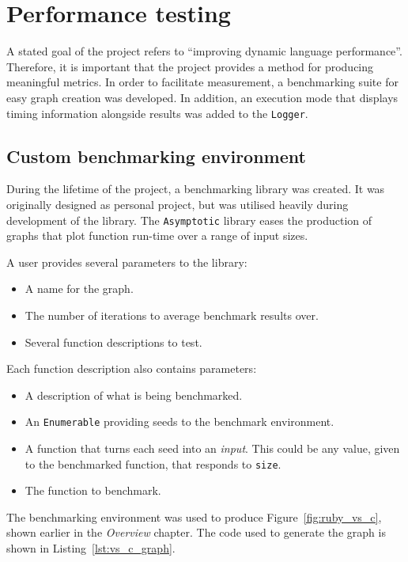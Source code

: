 \section{Performance testing}
A stated goal of the project refers to ``improving dynamic language performance''.
Therefore, it is important that the project provides a method for producing meaningful metrics.
In order to facilitate measurement, a benchmarking suite for easy graph creation was developed.
In addition, an execution mode that displays timing information alongside results was added to the \verb|Logger|.

\subsection{Custom benchmarking environment}
During the lifetime of the project, a benchmarking library was created. It was originally designed as personal project, but was utilised heavily during development of the library.  The \verb|Asymptotic| library eases the production of graphs that plot function run-time over a range of input sizes.

A user provides several parameters to the library:
\begin{itemize}
\item A name for the graph.
\item The number of iterations to average benchmark results over.
\item Several function descriptions to test.
\end{itemize}

Each function description also contains parameters:
\begin{itemize}
\item A description of what is being benchmarked.
\item An \verb|Enumerable| providing seeds to the benchmark environment.
\item A function that turns each seed into an \emph{input}. This could be any value, given to the benchmarked function, that responds to \verb|size|.
\item The function to benchmark.
\end{itemize}

The benchmarking environment was used to produce Figure~\ref{fig:ruby_vs_c}, shown earlier in the \emph{Overview} chapter. The code used to generate the graph is shown in Listing~\ref{lst:vs_c_graph}.

